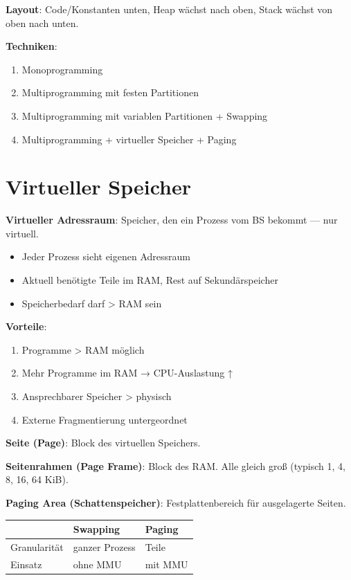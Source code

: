 \documentclass[11pt, a4paper]{article}
\begin{document}
\textbf{Layout}: Code/Konstanten unten, Heap wächst nach oben, Stack wächst von oben nach unten.


\textbf{Techniken}:

\begin{enumerate}
  \item Monoprogramming
  \item Multiprogramming mit festen Partitionen
  \item Multiprogramming mit variablen Partitionen + Swapping
  \item Multiprogramming + virtueller Speicher + Paging
\end{enumerate}


\section{Virtueller Speicher}

\textbf{Virtueller Adressraum}: Speicher, den ein Prozess vom BS bekommt — nur virtuell.

\begin{itemize}
  \item Jeder Prozess sieht eigenen Adressraum
  \item Aktuell benötigte Teile im RAM, Rest auf Sekundärspeicher
  \item Speicherbedarf darf > RAM sein
\end{itemize}

\textbf{Vorteile}:

\begin{enumerate}
  \item Programme > RAM möglich
  \item Mehr Programme im RAM → CPU-Auslastung ↑
  \item Ansprechbarer Speicher > physisch
  \item Externe Fragmentierung untergeordnet
\end{enumerate}

\textbf{Seite (Page)}: Block des virtuellen Speichers.


\textbf{Seitenrahmen (Page Frame)}: Block des RAM. Alle gleich groß (typisch 1, 4, 8, 16, 64 KiB).


\textbf{Paging Area (Schattenspeicher)}: Festplattenbereich für ausgelagerte Seiten.



{\small
\begin{tabularx}{\linewidth}{XXX}
\hline
\rowcolor{tableheadbg}
{\color{white}\textbf{}} & {\color{white}\textbf{Swapping}} & {\color{white}\textbf{Paging}} \\[2pt]
\hline
\endhead
\hline
\endfoot
Granularität & ganzer Prozess & Teile \\
Einsatz & ohne MMU & mit MMU \\
\end{tabularx}
}
\end{document}
